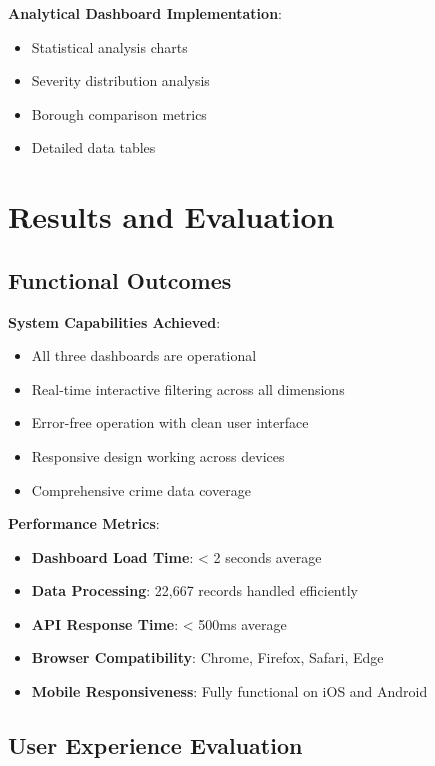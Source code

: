 \documentclass[12pt,a4paper]{article}
\begin{document}
\textbf{Analytical Dashboard Implementation}:
\begin{itemize}
    \item Statistical analysis charts
    \item Severity distribution analysis
    \item Borough comparison metrics
    \item Detailed data tables
\end{itemize}

\section{Results and Evaluation}

\subsection{Functional Outcomes}

\textbf{System Capabilities Achieved}:
\begin{itemize}
    \item[\checkmark] All three dashboards are operational
    \item[\checkmark] Real-time interactive filtering across all dimensions
    \item[\checkmark] Error-free operation with clean user interface
    \item[\checkmark] Responsive design working across devices
    \item[\checkmark] Comprehensive crime data coverage
\end{itemize}

\textbf{Performance Metrics}:
\begin{itemize}
    \item \textbf{Dashboard Load Time}: < 2 seconds average
    \item \textbf{Data Processing}: 22,667 records handled efficiently
    \item \textbf{API Response Time}: < 500ms average
    \item \textbf{Browser Compatibility}: Chrome, Firefox, Safari, Edge
    \item \textbf{Mobile Responsiveness}: Fully functional on iOS and Android
\end{itemize}

\subsection{User Experience Evaluation}
\end{document}
